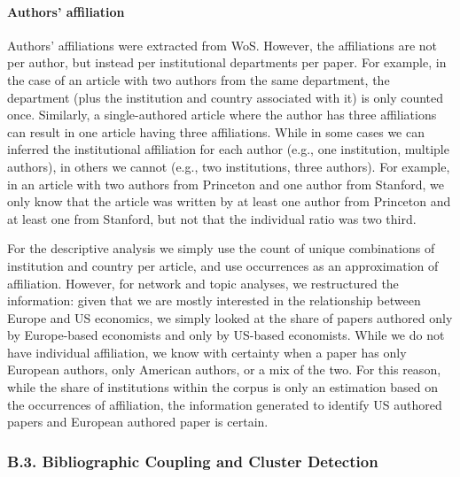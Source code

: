 \documentclass[
  12pt,
  onecolumn]{article}
\begin{document}
\hypertarget{author-affiliation}{%
\paragraph*{Authors' affiliation}\label{author-affiliation}}

Authors' affiliations were extracted from WoS. However, the affiliations are not per author, but instead per institutional departments per paper. For example, in the case of an article with two authors from the same department, the department (plus the institution and country associated with it) is only counted once. Similarly, a single-authored article where the author has three affiliations can result in one article having three affiliations. While in some cases we can inferred the institutional affiliation for each author (e.g., one institution, multiple authors), in others we cannot (e.g., two institutions, three authors). For example, in an article with two authors from Princeton and one author from Stanford, we only know that the article was written by at least one author from Princeton and at least one from Stanford, but not that the individual ratio was two third.

For the descriptive analysis we simply use the count of unique combinations of institution and country per article, and use occurrences as an approximation of affiliation. However, for network and topic analyses, we restructured the information: given that we are mostly interested in the relationship between Europe and US economics, we simply looked at the share of papers authored only by Europe-based economists and only by US-based economists. While we do not have individual affiliation, we know with certainty when a paper has only European authors, only American authors, or a mix of the two. For this reason, while the share of institutions within the corpus is only an estimation based on the occurrences of affiliation, the information generated to identify US authored papers and European authored paper is certain.

\hypertarget{network}{%
\subsubsection*{B.3. Bibliographic Coupling and Cluster Detection}\label{network}}
\end{document}
